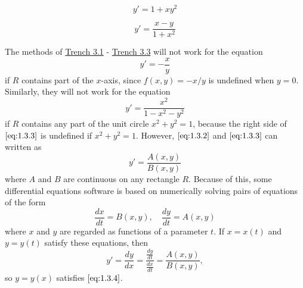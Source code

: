 \documentclass{ximera}
\begin{document}
\begin{example}\label{ex:fig010303}
$$
y'=1+xy^2
$$

\begin{center}  
\end{center}

\end{example}
\begin{example}\label{ex:fig010304}
$$
y'=\frac{x-y}{1+x^2}
$$

\begin{center}  
\end{center}

\end{example}
The methods of \href{https://ximera.osu.edu/ode/main/eulersMethod/eulersMethod}{Trench 3.1} - \href{https://ximera.osu.edu/ode/main/rungeKutta/rungeKutta}{Trench 3.3} will not work for the equation
\begin{equation} \label{eq:1.3.2}
y'=-\frac{x}{y}
\end{equation}
if $R$ contains part of the $x$-axis, since $f(x,y)=-x/y$ is undefined
when $y=0$. Similarly, they will not work for the equation
\begin{equation} \label{eq:1.3.3}
y'=\frac{x^2}{1-x^2-y^2}
\end{equation}
if $R$ contains any part of the unit circle $x^2+y^2=1$, because the
right side of $\eqref{eq:1.3.3}$ is undefined if $x^2+y^2=1$. However,
$\eqref{eq:1.3.2}$ and $\eqref{eq:1.3.3}$ can written as
\begin{equation} \label{eq:1.3.4}
y'=\frac{A(x,y)}{B(x,y)}
\end{equation}
where $A$ and $B$ are continuous on any rectangle $R$. Because of
this, some differential equations software is based on
numerically solving pairs of equations of the form
\begin{equation} \label{eq:1.3.5}
\frac{dx}{dt}=B(x,y),\quad \frac{dy}{dt}=A(x,y)
\end{equation}
where $x$ and $y$ are regarded as functions of a parameter $t$.
If $x=x(t)$ and $y=y(t)$  satisfy these equations, then
$$
y'=\frac{dy}{dx}=\frac{\frac{dy}{dt}}{\frac{dx}{dt}}=\frac{A(x,y)}{B(x,y)},
$$
so $y=y(x)$ satisfies $\eqref{eq:1.3.4}$.
 
\end{document}
